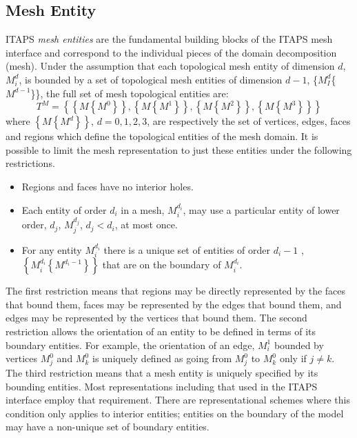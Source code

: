 \documentclass{article}
\begin{document}
\subsection{Mesh Entity}

ITAPS \emph{mesh entities} are the fundamental building blocks of 
the ITAPS mesh interface and correspond to the individual pieces 
of the domain decomposition (mesh). Under the assumption that 
each topological mesh entity of dimension $d$, $M^d_i$, 
is bounded by a set of topological mesh entities of dimension $d-1$, 
\{$M^d_I$\{$M^{d-1}$\}\}, the full set of mesh topological entities are:
\begin{equation}
T^M = \left\{ \left\{ M \left\{ M^0 \right\} \right\}, 
             \left\{ M \left\{ M^1 \right\} \right\}, 
             \left\{ M \left\{ M^2 \right\} \right\},
	     \left\{ M \left\{ M^3 \right\} \right\} \right\}
\end{equation}
where $\left\{ M \left\{ M^d \right\} \right\}$, $d=0,1,2,3$, are respectively 
the set of vertices, edges, faces and regions which define the 
topological entities of the mesh domain. It is possible to limit 
the mesh representation to just these entities under the following 
restrictions.

\begin{itemize}
\item  
Regions and faces have no interior holes.
\item  
Each entity of order $d_i$ in a mesh, $M^{d_i}_i$, may 
use a particular entity of lower order, $d_j$, $M^{d_j}_j$, $d_j <d_i$, at most once.
\item  
For any entity $M^{d_i}_i$ there is a unique 
set of entities of order $d_i - 1$ , $\left\{ M^{d_i}_i \left\{ M^{d_i - 1} 
\right\} \right\}$ that are on the boundary of $M^{d_i}_i$.

\end{itemize}

The first restriction means that regions may be directly represented 
by the faces that bound them, faces may be represented by the 
edges that bound them, and edges may be represented by the vertices 
that bound them. The second restriction allows the orientation 
of an entity to be defined in terms of its boundary entities. 
For example, the orientation of an edge, $M^{1}_i$ bounded 
by vertices $M^{0}_j$ and $M^{0}_k$ is uniquely 
defined as going from $M^{0}_j$ to $M^{0}_k$ 
only if  $j \neq k$. The third restriction means 
that a mesh entity is uniquely specified by its bounding entities. 
Most representations including that used in the ITAPS interface 
employ that requirement. There are representational schemes where 
this condition only applies to interior entities; entities on 
the boundary of the model may have a non-unique set of boundary 
entities.\\
\end{document}
